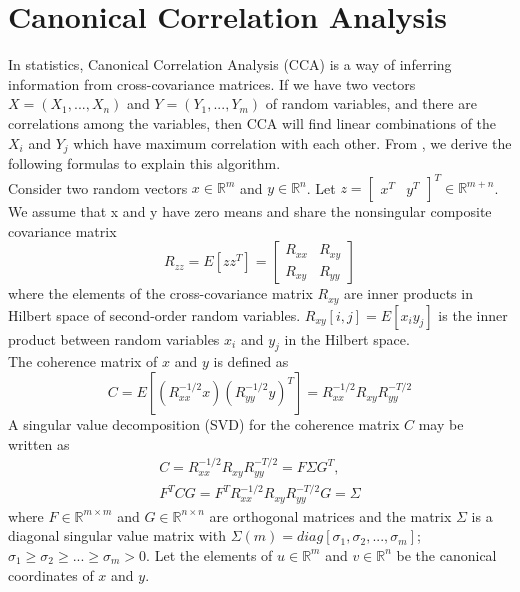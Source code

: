 \documentclass[12pt]{report} %
\begin{document}
\section{Canonical Correlation Analysis}
In statistics, Canonical Correlation Analysis (CCA) is a way of inferring information from cross-covariance matrices. If we have two vectors \(X = (X_{1}, ..., X_{n})\) and \(Y = (Y_{1}, ..., Y_{m})\) of random variables, and there are correlations among the variables, then CCA will find linear combinations of the $X_{i}$ and $Y_{j}$ which have maximum correlation with each other\cite{CCA}. From \cite{ECCA}, we derive the following formulas to explain this algorithm.\\
Consider two random vectors $x\in \mathbb{R}^{m}$ and $y\in \mathbb{R}^{n}$. Let $z= \begin{bmatrix}x^T & y^T\end{bmatrix}^T \in \mathbb{R}^{m+n}$. We assume that x and y have zero means and share the nonsingular composite covariance matrix
\begin{equation}
R_{zz}=E[zz^T]=\begin{bmatrix}
	R_{xx} & R_{xy} \\
	R_{xy} & R_{yy}
	\end{bmatrix}
\end{equation}
where the elements of the cross-covariance matrix $R_{xy}$ are inner products in Hilbert space of second-order random variables. $R_{xy}[i,j]=E[x_{i}y_{j}]$ is the inner product between random variables $x_{i}$ and $y_{j}$ in the Hilbert space. \\
The coherence matrix of $x$ and $y$ is defined as
\begin{equation}
C=E[(R_{xx}^{-1/2}x)(R_{yy}^{-1/2}y)^T]=R_{xx}^{-1/2}R_{xy}R_{yy}^{-T/2}
\end{equation}
A singular value decomposition (SVD) for the coherence matrix $C$ may be written as
\begin{equation}
\begin{split}
C=R_{xx}^{-1/2}R_{xy}R_{yy}^{-T/2}=F\Sigma G^T, \\ F^TCG=F^TR_{xx}^{-1/2}R_{xy}R_{yy}^{-T/2}G=\Sigma
\end{split}
\end{equation}
where $F\in \mathbb{R}^{m\times m}$ and $G\in \mathbb{R}^{n\times n}$ are orthogonal matrices and the matrix $\Sigma$ is a diagonal singular value matrix with $\Sigma(m)=diag[\sigma_{1},\sigma_{2},...,\sigma_{m}]$; $\sigma_{1}\geq\sigma_{2}\geq...\geq\sigma_{m}>0$. Let the elements of $u\in \mathbb{R}^{m}$ and $v\in \mathbb{R}^{n}$ be the canonical coordinates of $x$ and $y$. \\
\end{document}
